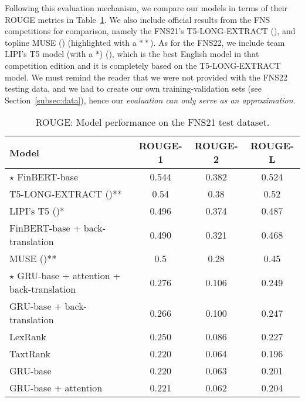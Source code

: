 Following this evaluation mechanism, we compare our models in terms of their ROUGE metrics in Table~\ref{tab:rouge_performance}.
We also include official results from the FNS competitions for comparison, namely the FNS21's T5-LONG-EXTRACT
(\cite{orzhenovskii-2021-t5}), and topline MUSE (\cite{litvak-last-2013-multilingual}) (highlighted with a $**$).
As for the FNS22, we include team LIPI's T5 model (with a $*$) (\cite{el-haj-etal-2022-financial}), which is the best English model
in that competition edition and it is completely based on the T5-LONG-EXTRACT model.
We must remind the reader that we were not provided with the FNS22 testing data, and we had to create our own training-validation sets (see Section~\ref{subsec:data}),
hence our \emph{evaluation can only serve as an approximation}.

\begin{table}[ht]
    \centering
    \begin{tabular}{lccc}
        \toprule
        \textbf{Model} & \textbf{ROUGE-1} & \textbf{ROUGE-2} & \textbf{ROUGE-L} \\
        \midrule
            $\star$ FinBERT-base & 0.544 & 0.382 & 0.524 \\
            T5-LONG-EXTRACT (\cite{orzhenovskii-2021-t5})** & 0.54 & 0.38 & 0.52 \\
            LIPI's T5 (\cite{el-haj-etal-2022-financial})* & 0.496 & 0.374 & 0.487 \\
            FinBERT-base + back-translation & 0.490 & 0.321 & 0.468 \\
            MUSE (\cite{litvak-last-2013-multilingual})** & 0.5 & 0.28 & 0.45 \\
            $\star$ GRU-base + attention + back-translation & 0.276 & 0.106 & 0.249 \\
            GRU-base + back-translation & 0.266 & 0.100 & 0.247 \\
            LexRank & 0.250 & 0.086 & 0.227 \\
            TaxtRank & 0.220 & 0.064 & 0.196 \\
            GRU-base & 0.220 & 0.063 & 0.201 \\
            GRU-base + attention & 0.221 & 0.062 & 0.204 \\
        \bottomrule
    \end{tabular}\caption{ROUGE: Model performance on the FNS21 test dataset.}
    \label{tab:rouge_performance}
\end{table}

